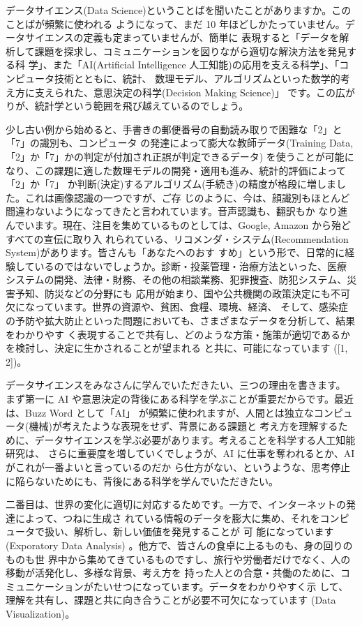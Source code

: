 \documentclass[
]{book}
\theoremstyle{definition}
\theoremstyle{definition}
\theoremstyle{definition}
\theoremstyle{definition}
\theoremstyle{remark}
\begin{document}
データサイエンス(Data Science)ということばを聞いたことがありますか。このことばが頻繁に使われる ようになって、まだ 10 年ほどしかたっていません。データサイエンスの定義も定まっていませんが、簡単に 表現すると「データを解析して課題を探求し、コミュニケーションを図りながら適切な解決方法を発見する科 学」、また「AI(Artificial Intelligence 人工知能)の応用を支える科学」、「コンピュータ技術とともに、統計、 数理モデル、アルゴリズムといった数学的考え方に支えられた、意思決定の科学(Decision Making Science)」 です。この広がりが、統計学という範囲を飛び越えているのでしょう。

少し古い例から始めると、手書きの郵便番号の自動読み取りで困難な「2」と「7」の識別も、コンピュータ の発達によって膨大な教師データ(Training Data,「2」か「7」かの判定が付加され正誤が判定できるデータ) を使うことが可能になり、この課題に適した数理モデルの開発・適用も進み、統計的評価によって「2」か「7」 か判断(決定)するアルゴリズム(手続き)の精度が格段に増しました。これは画像認識の一つですが、ご存 じのように、今は、顔識別もほとんど間違わないようになってきたと言われています。音声認識も、翻訳もか なり進んでいます。現在、注目を集めているものとしては、Google, Amazon から殆どすべての宣伝に取り入 れられている、リコメンダ・システム(Recommendation System)があります。皆さんも「あなたへのおす すめ」という形で、日常的に経験しているのではないでしょうか。診断・投薬管理・治療方法といった、医療 システムの開発、法律・財務、その他の相談業務、犯罪捜査、防犯システム、災害予知、防災などの分野にも 応用が始まり、国や公共機関の政策決定にも不可欠になっています。世界の資源や、貧困、食糧、環境、経済、 そして、感染症の予防や拡大防止といった問題においても、さまざまなデータを分析して、結果をわかりやす く表現することで共有し、どのような方策・施策が適切であるかを検討し、決定に生かされることが望まれる と共に、可能になっています ({[}1, 2{]})。

データサイエンスをみなさんに学んでいただきたい、三つの理由を書きます。
まず第一に AI や意思決定の背後にある科学を学ぶことが重要だからです。最近は、Buzz Word として「AI」 が頻繁に使われますが、人間とは独立なコンピュータ(機械)が考えたような表現をせず、背景にある課題と 考え方を理解するために、データサイエンスを学ぶ必要があります。考えることを科学する人工知能研究は、 さらに重要度を増していくでしょうが、AI に仕事を奪われるとか、AI がこれが一番よいと言っているのだか ら仕方がない、というような、思考停止に陥らないためにも、背後にある科学を学んでいただきたい。

二番目は、世界の変化に適切に対応するためです。一方で、インターネットの発達によって、つねに生成さ れている情報のデータを膨大に集め、それをコンピュータで扱い、解析し、新しい価値を発見することが 可 能になっています (Exporatory Data Analysis) 。他方で、皆さんの食卓に上るものも、身の回りのものも世
界中から集めてきているものですし、旅行や労働者だけでなく、人の移動が活発化し、多様な背景、考え方を 持った人との合意・共働のために、コミュニケーションがたいせつになっています。データをわかりやすく示 して、理解を共有し、課題と共に向き合うことが必要不可欠になっています (Data Visualization)。
\end{document}
